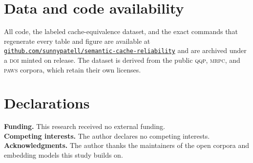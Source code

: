 \documentclass[11pt,letterpaper]{article}
\begin{document}
















\section*{Data and code availability}
All code, the labeled cache-equivalence dataset, and the exact commands that regenerate every
table and figure are available at
\href{https://github.com/sunnypatell/semantic-cache-reliability}{\nolinkurl{github.com/sunnypatell/semantic-cache-reliability}}
and are archived under a \textsc{doi} minted on release. The dataset is derived from the public
\textsc{qqp}, \textsc{mrpc}, and \textsc{paws} corpora, which retain their own licenses.

\section*{Declarations}
\noindent\textbf{Funding.} This research received no external funding.\\
\textbf{Competing interests.} The author declares no competing interests.\\
\textbf{Acknowledgments.} The author thanks the maintainers of the open corpora and embedding
models this study builds on.

\printbibliography

\appendix

\end{document}
